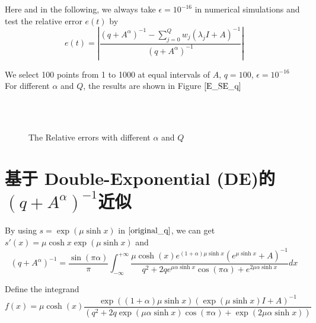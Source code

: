 Here and in the following, we always take $\epsilon=10^{-16}$ in numerical simulations and test the relative error $e(t)$ by
\begin{equation}
	e(t)=\left|\frac{(q+{A}^{\alpha})^{-1}-\sum_{j=0}^{Q}w_j(\lambda_jI+A)^{-1}}{(q+{A}^{\alpha})^{-1}}\right|
	\label{error_q}
\end{equation}

We select 100 points from 1 to 1000 at equal intervals of $A$, $q=100$,  $\epsilon=10^{-16}$ For different $\alpha$ and $Q$, the results are shown in Figure $\ref{E_SE_q}$

\begin{figure}[htbp]
	\centering
	~~
	~~
	~~
	\\
	~~
	~~
	~~
	~~
	\caption{The Relative errors with different $\alpha$ and $Q$}
	\label{E_SE_q}
\end{figure}

\section{基于 Double-Exponential (DE)的$(q+{A}^{\alpha})^{-1}$近似}

By using $s=\exp(\mu\sinh x)$ in $\eqref{original_q}$,  we can get $s'(x)=\mu \cosh x \exp(\mu \sinh x)$ and
\begin{equation}
	(q+{A}^{\alpha})^{-1}=\frac{\sin(\pi \alpha)}{\pi}\int_{-\infty}^{+\infty}
		\frac{\mu\cosh(x)e^{(1+\alpha)\mu\sinh x}(e^{\mu\sinh x}+A)^{-1}}{q^2+2qe^{\mu \alpha \sinh x}\cos(\pi\alpha)+e^{2\mu\alpha\sinh x}}dx
	\label{de_q}
\end{equation}

Define the integrand
\begin{equation}
	f(x)=\mu\cosh(x)\frac{\exp((1+\alpha)\mu\sinh x)(\exp(\mu\sinh x){I}+A)^{-1}}{(q^2+2q\exp(\mu \alpha \sinh x)\cos(\pi\alpha)+\exp(2\mu\alpha\sinh x))}
	\label{function_DE_q}
\end{equation}

